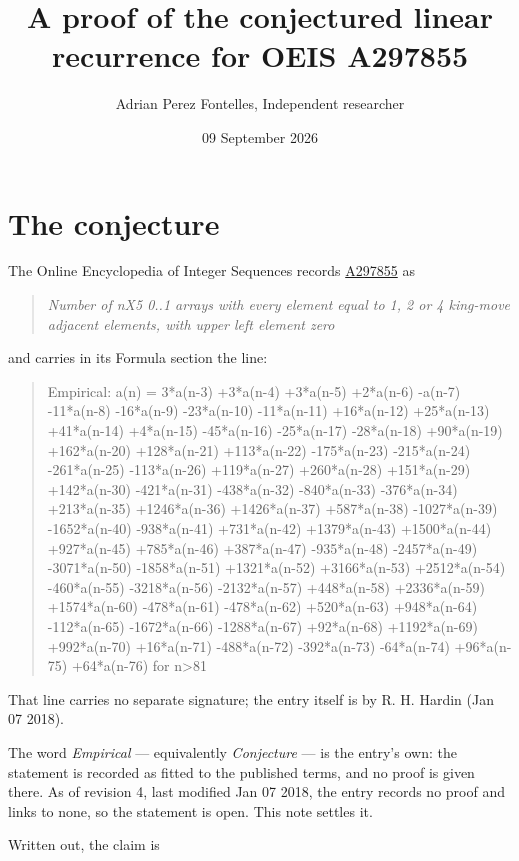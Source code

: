 \documentclass[11pt]{article}
\title{A proof of the conjectured linear recurrence for OEIS A297855}
\author{Adrian Perez Fontelles, Independent researcher}
\date{09 September 2026}
\theoremstyle{definition}
\begin{document}
\maketitle
\section{The conjecture}

The Online Encyclopedia of Integer Sequences records \href{https://oeis.org/A297855}{A297855} as

\begin{quote}\itshape Number of nX5 0..1 arrays with every element equal to 1, 2 or 4 king-move adjacent elements, with upper left element zero\end{quote}

and carries in its Formula section the line:

\begin{quote}\ttfamily Empirical: a(n) = 3*a(n-3) +3*a(n-4) +3*a(n-5) +2*a(n-6) -a(n-7) -11*a(n-8) -16*a(n-9) -23*a(n-10) -11*a(n-11) +16*a(n-12) +25*a(n-13) +41*a(n-14) +4*a(n-15) -45*a(n-16) -25*a(n-17) -28*a(n-18) +90*a(n-19) +162*a(n-20) +128*a(n-21) +113*a(n-22) -175*a(n-23) -215*a(n-24) -261*a(n-25) -113*a(n-26) +119*a(n-27) +260*a(n-28) +151*a(n-29) +142*a(n-30) -421*a(n-31) -438*a(n-32) -840*a(n-33) -376*a(n-34) +213*a(n-35) +1246*a(n-36) +1426*a(n-37) +587*a(n-38) -1027*a(n-39) -1652*a(n-40) -938*a(n-41) +731*a(n-42) +1379*a(n-43) +1500*a(n-44) +927*a(n-45) +785*a(n-46) +387*a(n-47) -935*a(n-48) -2457*a(n-49) -3071*a(n-50) -1858*a(n-51) +1321*a(n-52) +3166*a(n-53) +2512*a(n-54) -460*a(n-55) -3218*a(n-56) -2132*a(n-57) +448*a(n-58) +2336*a(n-59) +1574*a(n-60) -478*a(n-61) -478*a(n-62) +520*a(n-63) +948*a(n-64) -112*a(n-65) -1672*a(n-66) -1288*a(n-67) +92*a(n-68) +1192*a(n-69) +992*a(n-70) +16*a(n-71) -488*a(n-72) -392*a(n-73) -64*a(n-74) +96*a(n-75) +64*a(n-76) for n>81\end{quote}

That line carries no separate signature; the entry itself is by R. H. Hardin (Jan 07 2018).

The word {\itshape Empirical} --- equivalently {\itshape Conjecture} --- is the entry's own: the statement is recorded as fitted to the published terms, and no proof is given there. As of revision 4, last modified Jan 07 2018, the entry records no proof and links to none, so the statement is open. This note settles it.

Written out, the claim is
\end{document}
